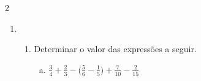 \documentclass[a4paper,14pt]{article}
\begin{document}
\begin{multicols}{2}
\begin{enumerate}
\begin{enumerate}[a)]
    			\item $7 + \frac{1}{4}$ \\\\\\\\\\\\\\\\
    			\item $\frac{7}{8} - \frac{6}{7} - \frac{5}{6}$ \\\\\\\\\\\\\\\\
    			\item $\frac{1}{2} - \frac{1}{5} - \frac{1}{10}$ \\\\\\\\\\\\\\\\
    			\item $9 - \frac{15}{7}$ \newpage
    		\end{enumerate}
    		\item \begin{enumerate}[label=\Roman*.] %
    			\item Determinar o valor das expressões a seguir.
    			\begin{enumerate}[a)]
    				\item $\frac{3}{4} + \frac{2}{3} - \bigg(\frac{5}{6} - \frac{1}{5}\bigg) + \frac{7}{10} - \frac{2}{15}$ \\\\\\\\\\\\\\\\\\\\\\\\\\\\\\\\\\\\

\end{enumerate}
\end{enumerate}
\end{enumerate}
\end{multicols}
\end{document}
